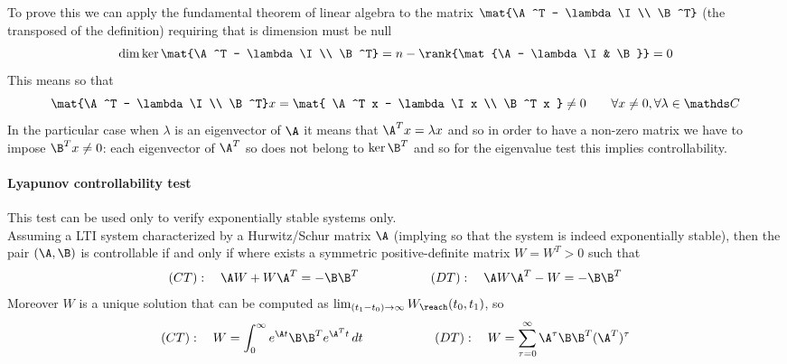 	To prove this we can apply the fundamental theorem of linear algebra to the matrix $\mat{\A^T - \lambda \I \\ \B^T}$ (the transposed of the definition) requiring that is dimension must be null
	\[ \dim \ker \mat{\A^T - \lambda \I \\ \B^T} = n - \rank{\mat{\A- \lambda \I & \B}} = 0 \]
	This means so that
	\[ \mat{\A^T - \lambda \I \\ \B^T} x = \mat{ \A^T x - \lambda \I x \\ \B^T x }\neq 0 \qquad \forall x \neq 0, \forall \lambda \in \mathds C\]
	In the particular case when $\lambda$ is an eigenvector of $\A$ it means that $\A^T x = \lambda x$ and so in order to have a non-zero matrix we have to impose $\B^T x \neq 0$: each eigenvector of $\A^T$ so does not belong to $\ker \B^T$ and so for the eigenvalue test this implies controllability.
	
	\paragraph{Lyapunov controllability test} This test can be used only to verify exponentially stable systems only.\\
	Assuming a LTI system characterized by a Hurwitz/Schur matrix $\A$ (implying so that the system is indeed exponentially stable), then the pair $(\A,\B)$ is controllable if and only if where exists a symmetric positive-definite matrix $W = W^T > 0$ such that 
	\begin{equation} \label{eq:temp1}
		(CT): \quad \A W + W \A^T = - \B \B^T \hspace{2cm} (DT): \quad \A W \A^T - W = - \B \B^T
	\end{equation}
	Moreover $W$ is a unique solution that can be computed as $\lim_{(t_1-t_0) \rightarrow \infty} W_\reach(t_0,t_1)$, so
	\[ (CT): \quad W = \int_0^\infty e^{\A t} \B \B^T e^{\A^Tt}\, dt \hspace{2cm} (DT): \quad W = \sum_{\tau = 0}^{\infty} \A^\tau \B \B^T(\A^T)^\tau \]
	
